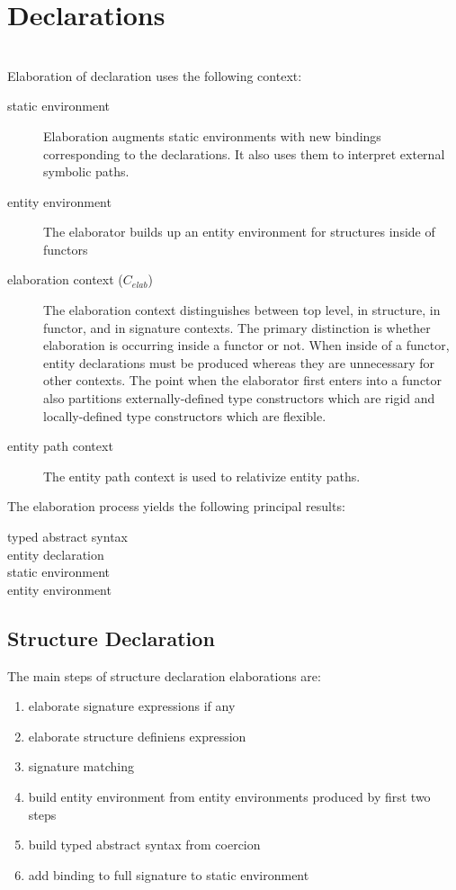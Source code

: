 \section{Declarations}
\\
Elaboration of declaration uses the following context:
\begin{description}
	\item[static environment] Elaboration augments static environments with new bindings corresponding to the declarations. It also uses them to interpret external symbolic paths. 
	\item[entity environment] The elaborator builds up an entity environment for structures inside of functors 
	\item[elaboration context ($C_{elab}$)] The elaboration context distinguishes between top level, in structure, in functor, and in signature contexts. The primary distinction is whether elaboration is occurring inside a functor or not. When inside of a functor, entity declarations must be produced whereas they are unnecessary for other contexts. The point when the elaborator first enters into a functor also partitions externally-defined type constructors which are rigid and locally-defined type constructors which are flexible. 
	\item[entity path context] The entity path context is used to relativize entity paths. 
\end{description}
The elaboration process yields the following principal results:
\begin{description}
	\item[typed abstract syntax]
	\item[entity declaration]
	\item[static environment]
	\item[entity environment]
\end{description}

\subsection{Structure Declaration}
The main steps of structure declaration elaborations are:
\begin{enumerate}
	\item elaborate signature expressions if any
	\item elaborate structure definiens expression
	\item signature matching
	\item build entity environment from entity environments produced by first two steps
	\item build typed abstract syntax from coercion
	\item add binding to full signature to static environment
\end{enumerate}

